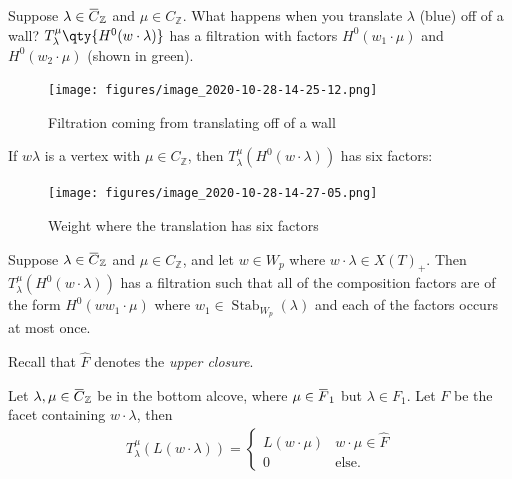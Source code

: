 Suppose
\(\lambda \in \mkern 1.5mu\overline{\mkern-1.5muC\mkern-1.5mu}\mkern 1.5mu_{\mathbb{Z}}\)
and \(\mu \in C_{\mathbb{Z}}\). What happens when you translate
\(\lambda\) (blue) off of a wall?
\(T_\lambda^\mu\qty{H^0(w\cdot \lambda)}\) has a filtration with factors
\(H^0(w_1\cdot \mu)\) and \(H^0(w_2\cdot \mu)\) (shown in green).

\begin{figure}
\centering
\texttt{[image: figures/image\_2020-10-28-14-25-12.png]}
\caption{Filtration coming from translating off of a wall}
\end{figure}

If \(w\lambda\) is a vertex with \(\mu \in C_{\mathbb{Z}}\), then
\(T_\lambda^\mu(H^0(w\cdot \lambda))\) has six factors:

\begin{figure}
\centering
\texttt{[image: figures/image\_2020-10-28-14-27-05.png]}
\caption{Weight where the translation has six factors}
\end{figure}

\begin{proposition}[?]

Suppose
\(\lambda \in \mkern 1.5mu\overline{\mkern-1.5muC\mkern-1.5mu}\mkern 1.5mu_{\mathbb{Z}}\)
and \(\mu \in C_{\mathbb{Z}}\), and let \(w\in W_p\) where
\(w\cdot \lambda \in X(T)_+\). Then
\(T_\lambda^\mu (H^0(w\cdot \lambda))\) has a filtration such that all
of the composition factors are of the form \(H^0(ww_1 \cdot \mu)\) where
\(w_1\in {\operatorname{Stab}}_{W_p}(\lambda)\) and each of the factors
occurs at most once.

\end{proposition}

Recall that \(\widehat{F}\) denotes the \emph{upper closure}.

\begin{proposition}[?]

Let
\(\lambda, \mu \in \mkern 1.5mu\overline{\mkern-1.5muC\mkern-1.5mu}\mkern 1.5mu_{\mathbb{Z}}\)
be in the bottom alcove, where
\(\mu \in \mkern 1.5mu\overline{\mkern-1.5muF\mkern-1.5mu}\mkern 1.5mu_1\)
but \(\lambda\in F_1\). Let \(F\) be the facet containing
\(w\cdot\lambda\), then
\begin{align*}  
T_\lambda^\mu(L(w\cdot \lambda)) = 
\begin{cases}
L(w\cdot \mu)  & w\cdot \mu \in \widehat{F} \\
0 & \text{else}.
\end{cases}
\end{align*}

\end{proposition}

